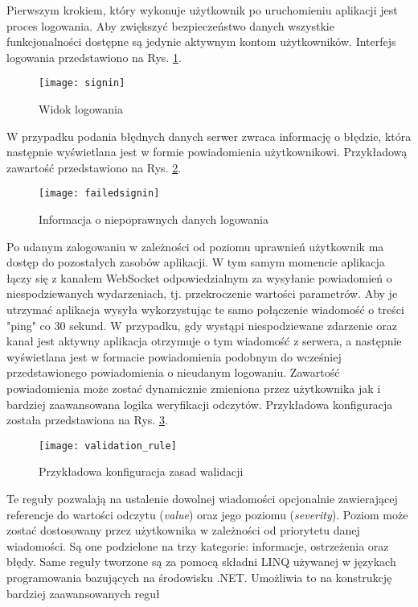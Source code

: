 Pierwszym krokiem, który wykonuje użytkownik po uruchomieniu aplikacji jest 
proces logowania. Aby zwiększyć bezpieczeństwo danych wszystkie funkcjonalności
dostępne są jedynie aktywnym kontom użytkowników.
Interfejs logowania przedstawiono na Rys. \ref{atmosphere:signin}.
\begin{figure}[h!]
  \centering
  \texttt{[image: signin]}
  \caption{Widok logowania}
  \label{atmosphere:signin}
\end{figure}
W przypadku podania błędnych danych serwer zwraca informację o błędzie, która następnie
wyświetlana jest w formie powiadomienia użytkownikowi. Przykładową zawartość przedstawiono
na Rys. \ref{atmosphere:failedsignin}.
\begin{figure}[h!]
  \centering
  \texttt{[image: failedsignin]}
  \caption{Informacja o niepoprawnych danych logowania}
  \label{atmosphere:failedsignin}
\end{figure}
Po udanym zalogowaniu w zależności od poziomu uprawnień użytkownik ma dostęp
do pozostałych zasobów aplikacji.
W tym samym momencie aplikacja łączy się z kanałem WebSocket odpowiedzialnym za
wysyłanie powiadomień o niespodziewanych wydarzeniach, tj. przekroczenie
wartości parametrów. Aby je utrzymać aplikacja wysyła wykorzystując te samo
połączenie wiadomość o treści "ping" co 30 sekund. W przypadku, gdy
wystąpi niespodziewane zdarzenie oraz kanał jest aktywny aplikacja otrzymuje
o tym wiadomość z serwera, a następnie wyświetlana jest w formacie powiadomienia
podobnym do wcześniej przedstawionego powiadomienia o nieudanym logowaniu.
Zawartość powiadomienia może zostać dynamicznie zmieniona przez użytkownika
jak i bardziej zaawansowana logika weryfikacji odczytów. Przykładowa konfiguracja
została przedstawiona na Rys. \ref{atmosphere:validation_rule}.
\begin{figure}[h!]
  \centering
  \texttt{[image: validation\_rule]}
  \caption{Przykładowa konfiguracja zasad walidacji}
  \label{atmosphere:validation_rule}
\end{figure}
Te reguły pozwalają na ustalenie dowolnej wiadomości opcjonalnie zawierającej referencje
do wartości odczytu (\textit{value}) oraz jego poziomu (\textit{severity}). Poziom może zostać
dostosowany przez użytkownika w zależności od priorytetu danej wiadomości.
Są one podzielone na trzy kategorie: informacje, ostrzeżenia oraz błędy.
Same reguły tworzone są za pomocą składni LINQ używanej w językach programowania
bazujących na środowisku .NET. Umożliwia to na konstrukcję bardziej zaawansowanych reguł
